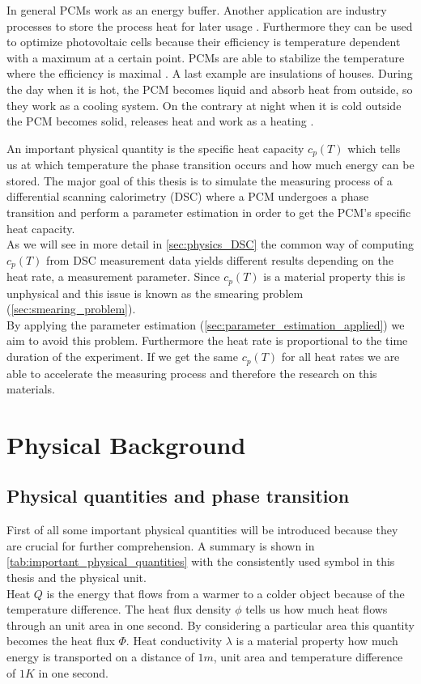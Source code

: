 \documentclass{scrartcl}[12pt, halfparskip]
\numberwithin{equation}{section}
\numberwithin{figure}{section}
\numberwithin{table}{section}
\begin{document}
In general PCMs work as an energy buffer. Another application are industry processes to store the process heat for later usage \cite{pcm_process_heat}. Furthermore they can be used to optimize photovoltaic cells because their efficiency is temperature dependent with a maximum at a certain point. PCMs are able to stabilize the temperature where the efficiency is maximal \cite{pcm_solar_cells}. 
A last example are insulations of houses. During the day when it is hot, the PCM becomes liquid and absorb heat from outside, so they work as a cooling system. On the contrary at night when it is cold outside the PCM becomes solid, releases heat and work as a heating \cite{pcm_house_insulation}. 


An important physical quantity is the specific heat capacity $c_p(T)$ which tells us at which temperature the phase transition occurs and how much energy can be stored. The major goal of this thesis is to simulate the measuring process of a differential scanning calorimetry (DSC) where a PCM undergoes a phase transition and perform a parameter estimation in order to get the PCM's specific heat capacity. \\
As we will see in more detail in \cref{sec:physics_DSC} the common way of computing $c_p(T)$ from DSC measurement data yields different results depending on the heat rate, a measurement parameter. Since $c_p(T)$ is a material property this is unphysical and this issue is known as the smearing problem (\cref{sec:smearing_problem}). \\
By applying the parameter estimation (\cref{sec:parameter_estimation_applied}) we aim to avoid this problem. Furthermore the heat rate is proportional to the time duration of the experiment. If we get the same $c_p(T)$ for all heat rates we are able to accelerate the measuring process and therefore the research on this materials.
 


\section{Physical Background}
\subsection{Physical quantities and phase transition}

First of all some important physical quantities will be introduced because they are crucial for further comprehension. A summary is shown in \cref{tab:important_physical_quantities} with the consistently used symbol in this thesis and the physical unit. \\
Heat $Q$ is the energy that flows from a warmer to a colder object because of the temperature difference. The heat flux density $\phi$ tells us how much heat flows through an unit area in one second. By considering a particular area this quantity becomes the heat flux $\varPhi$. Heat conductivity $\lambda$ is a material property how much energy is transported on a distance of $1m$, unit area and temperature difference of $1K$ in one second.
\end{document}
